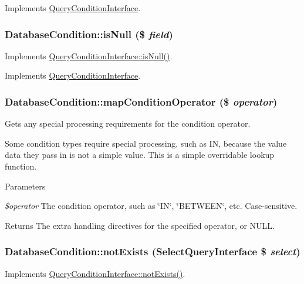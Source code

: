 Implements \hyperlink{interfaceQueryConditionInterface_a8bbb6acc9c72911b165cf6eb1dc31453}{QueryConditionInterface}.\hypertarget{classDatabaseCondition_af4ff7dba8bee46426fbc8b5930d860f0}{
\subsubsection[{isNull}]{\setlength{\rightskip}{0pt plus 5cm}DatabaseCondition::isNull (\$ {\em field})}}
\label{classDatabaseCondition_af4ff7dba8bee46426fbc8b5930d860f0}
Implements \hyperlink{interfaceQueryConditionInterface_a2978b536a3fe62b21e940366c9cb5923}{QueryConditionInterface::isNull()}. 

Implements \hyperlink{interfaceQueryConditionInterface_a2978b536a3fe62b21e940366c9cb5923}{QueryConditionInterface}.\hypertarget{classDatabaseCondition_afb4e820b6d1719bf940526beef27dc7a}{
\subsubsection[{mapConditionOperator}]{\setlength{\rightskip}{0pt plus 5cm}DatabaseCondition::mapConditionOperator (\$ {\em operator})}}
\label{classDatabaseCondition_afb4e820b6d1719bf940526beef27dc7a}
Gets any special processing requirements for the condition operator.

Some condition types require special processing, such as IN, because the value data they pass in is not a simple value. This is a simple overridable lookup function.


\begin{DoxyParams}{Parameters}
\item[{\em \$operator}]The condition operator, such as \char`\"{}IN\char`\"{}, \char`\"{}BETWEEN\char`\"{}, etc. Case-\/sensitive.\end{DoxyParams}
\begin{DoxyReturn}{Returns}
The extra handling directives for the specified operator, or NULL. 
\end{DoxyReturn}
\hypertarget{classDatabaseCondition_a435abef28b40645e5939eb521ac5407b}{
\subsubsection[{notExists}]{\setlength{\rightskip}{0pt plus 5cm}DatabaseCondition::notExists ({\bf SelectQueryInterface} \$ {\em select})}}
\label{classDatabaseCondition_a435abef28b40645e5939eb521ac5407b}
Implements \hyperlink{interfaceQueryConditionInterface_a8aae11796846850edbf8caa3a9d4afcd}{QueryConditionInterface::notExists()}. 

